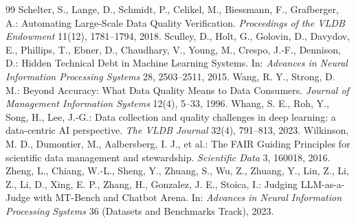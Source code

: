 \documentclass[a4paper,12pt]{article}
\theoremstyle{definition}
\begin{document}
\begin{thebibliography}{99}
 Schelter, S., Lange, D., Schmidt, P., Celikel, M., Biessmann, F., Grafberger, A.: Automating Large-Scale Data Quality Verification. \emph{Proceedings of the VLDB Endowment} 11(12), 1781--1794, 2018.
 Sculley, D., Holt, G., Golovin, D., Davydov, E., Phillips, T., Ebner, D., Chaudhary, V., Young, M., Crespo, J.-F., Dennison, D.: Hidden Technical Debt in Machine Learning Systems. In: \emph{Advances in Neural Information Processing Systems} 28, 2503--2511, 2015.
 Wang, R. Y., Strong, D. M.: Beyond Accuracy: What Data Quality Means to Data Consumers. \emph{Journal of Management Information Systems} 12(4), 5--33, 1996.
 Whang, S. E., Roh, Y., Song, H., Lee, J.-G.: Data collection and quality challenges in deep learning: a data-centric AI perspective. \emph{The VLDB Journal} 32(4), 791--813, 2023.
 Wilkinson, M. D., Dumontier, M., Aalbersberg, I. J., et al.: The FAIR Guiding Principles for scientific data management and stewardship. \emph{Scientific Data} 3, 160018, 2016.
 Zheng, L., Chiang, W.-L., Sheng, Y., Zhuang, S., Wu, Z., Zhuang, Y., Lin, Z., Li, Z., Li, D., Xing, E. P., Zhang, H., Gonzalez, J. E., Stoica, I.: Judging LLM-as-a-Judge with MT-Bench and Chatbot Arena. In: \emph{Advances in Neural Information Processing Systems} 36 (Datasets and Benchmarks Track), 2023.
\end{thebibliography}
\end{document}
